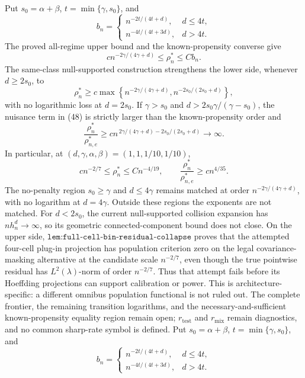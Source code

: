 Put \(s_0=\alpha+\beta\), \(t=\min\{\gamma,s_0\}\), and
\[
 b_n=
 \begin{cases}
 n^{-2t/(4t+d)},&d\le4t,\\
 n^{-4t/(4t+3d)},&d>4t.
 \end{cases}
\]
The proved all-regime upper bound and the known-propensity converse give
\[
 c n^{-2\gamma/(4\gamma+d)}\le\rho_n^*\le Cb_n.
\]
The same-class null-supported construction strengthens the lower side, whenever \(d\ge2s_0\), to
\[
 \rho_n^*\ge c\max\left\{
 n^{-2\gamma/(4\gamma+d)},
 n^{-2s_0/(2s_0+d)}
 \right\},                                                                           \tag{48}
\]
with no logarithmic loss at \(d=2s_0\).  If \(\gamma>s_0\) and \(d>2s_0\gamma/(\gamma-s_0)\), the nuisance term in (48) is strictly larger than the known-propensity order and
\[
 \frac{\rho_n^*}{\rho_{n,e}^*}
 \ge c n^{\,2\gamma/(4\gamma+d)-2s_0/(2s_0+d)}\longrightarrow\infty.                  \tag{49}
\]
In particular, at \((d,\gamma,\alpha,\beta)=(1,1,1/10,1/10)\),
\[
 c n^{-2/7}\le\rho_n^*\le Cn^{-4/19},
 \qquad
 \frac{\rho_n^*}{\rho_{n,e}^*}\ge c n^{4/35}.                                       \tag{50}
\]
The no-penalty region \(s_0\ge\gamma\) and \(d\le4\gamma\) remains matched at order \(n^{-2\gamma/(4\gamma+d)}\), with no logarithm at \(d=4\gamma\).  Outside these regions the exponents are not matched.  For \(d<2s_0\), the current null-supported collision expansion has \(nh_n^d\to\infty\), so its geometric connected-component bound does not close.  On the upper side, \(\texttt{lem:full-cell-bin-residual-collapse}\) proves that the attempted four-cell plug-in projection has population criterion zero on the legal covariance-masking alternative at the candidate scale \(n^{-2/7}\), even though the true pointwise residual has \(L^2(\lambda)\)-norm of order \(n^{-2/7}\).  Thus that attempt fails before its Hoeffding projections can support calibration or power.  This is architecture-specific: a different omnibus population functional is not ruled out.  The complete frontier, the remaining transition logarithms, and the necessary-and-sufficient known-propensity equality region remain open; \(r_{\mathrm{test}}\) and \(r_{\mathrm{mix}}\) remain diagnostics, and no common sharp-rate symbol is defined.
Put \(s_0=\alpha+\beta\), \(t=\min\{\gamma,s_0\}\), and
\[
 b_n=
 \begin{cases}
 n^{-2t/(4t+d)},&d\le4t,\\
 n^{-4t/(4t+3d)},&d>4t.
 \end{cases}
\]

